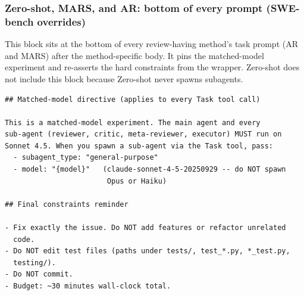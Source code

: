 \documentclass{article}
\begin{document}
\subsubsection{Zero-shot, MARS, and AR: bottom of every prompt (SWE-bench overrides)}
\label{app:prompts-swebench-overrides}
\label{app:prompts-swebench-ar-overrides}

This block sits at the bottom of every review-having method's task
prompt (AR and MARS) after the method-specific body. It pins the
matched-model experiment and re-asserts the hard constraints from
the wrapper. Zero-shot does not include this block because Zero-shot
never spawns subagents.

\begin{footnotesize}
\begin{verbatim}
## Matched-model directive (applies to every Task tool call)

This is a matched-model experiment. The main agent and every
sub-agent (reviewer, critic, meta-reviewer, executor) MUST run on
Sonnet 4.5. When you spawn a sub-agent via the Task tool, pass:
  - subagent_type: "general-purpose"
  - model: "{model}"   (claude-sonnet-4-5-20250929 -- do NOT spawn
                        Opus or Haiku)

## Final constraints reminder

- Fix exactly the issue. Do NOT add features or refactor unrelated
  code.
- Do NOT edit test files (paths under tests/, test_*.py, *_test.py,
  testing/).
- Do NOT commit.
- Budget: ~30 minutes wall-clock total.
\end{verbatim}
\end{footnotesize}
\end{document}
